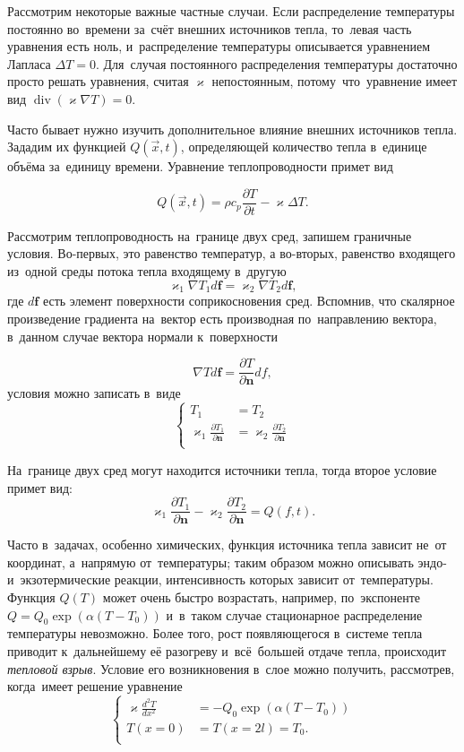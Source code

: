 Рассмотрим некоторые важные частные случаи.
Если распределение температуры постоянно во~времени за~счёт внешних источников тепла, то~левая часть уравнения есть ноль, и~распределение температуры описывается уравнением Лапласа $\Delta{T} = 0$.
Для~случая постоянного распределения температуры достаточно просто решать уравнения, считая $\varkappa$ непостоянным, потому~что~уравнение имеет вид $\operatorname{div}{\left(\varkappa\nabla{T}\right)} = 0$.

Часто бывает нужно изучить дополнительное влияние внешних источников тепла.
Зададим их функцией $Q(\vec{x}, t)$, определяющей количество тепла в~единице объёма за~единицу времени.
Уравнение теплопроводности примет вид

$$Q(\vec{x}, t) = \rho{}c_p\frac{\partial{T}}{\partial{t}} -\varkappa\Delta{T}.$$

Рассмотрим теплопроводность на~границе двух сред, запишем граничные условия.
Во-первых, это равенство температур, а во-вторых, равенство входящего из~одной среды потока тепла входящему в~другую
$$\varkappa_1\nabla{T_1}d\mathbf{f} = \varkappa_2\nabla{T_2}d\mathbf{f},$$
где $d\mathbf{f}$ есть элемент поверхности соприкосновения сред.
Вспомнив, что скалярное произведение градиента на~вектор есть производная по~направлению вектора, в~данном случае вектора нормали к~поверхности

$$\nabla{T}d\mathbf{f} = \frac{\partial{T}}{\partial{\mathbf{n}}}df,$$
условия можно записать в~виде
$$\left\{
    \begin{aligned}
	   T_1 &= T_2 \\
	   \varkappa_1\frac{\partial{T_1}}{\partial{\mathbf{n}}} &= \varkappa_2\frac{\partial{T_2}}{\partial{\mathbf{n}}} \\
	\end{aligned}
   \right.
$$

На~границе двух сред могут находится источники тепла, тогда второе условие примет вид:
$$\varkappa_1\frac{\partial{T_1}}{\partial{\mathbf{n}}} - \varkappa_2\frac{\partial{T_2}}{\partial{\mathbf{n}}} = Q(f, t).$$

Часто в~задачах, особенно химических, функция источника тепла зависит не~от координат, а~напрямую от~температуры; таким образом можно описывать эндо- и~экзотермические реакции, интенсивность которых зависит от~температуры.
Функция $Q(T)$ может очень быстро возрастать, например, по~экспоненте $Q = Q_0\exp\left({\alpha(T-T_0)}\right)$ и~в~таком случае стационарное распределение температуры невозможно.
Более того, рост появляющегося в~системе тепла приводит к~дальнейшему её разогреву и~всё~большей отдаче тепла, происходит \emph{тепловой взрыв}.
Условие его возникновения в~слое можно получить, рассмотрев, когда~имеет решение уравнение
$$\left\{
    \begin{aligned}
       \varkappa\frac{d^2T}{dx^2} &= -Q_0\exp\left({\alpha(T-T_0)}\right) \\
       T(x = 0) &= T(x = 2l) = T_0. \\
	\end{aligned}
   \right.
$$

